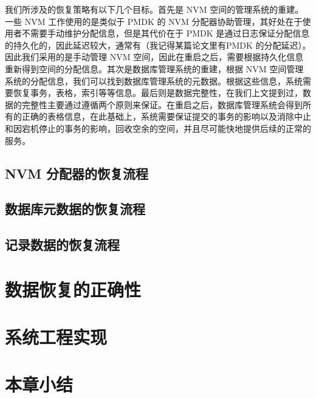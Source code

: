 我们所涉及的恢复策略有以下几个目标。首先是 NVM 空间的管理系统的重建。一些 NVM 工作使用的是类似于 PMDK 的 NVM 分配器协助管理，其好处在于使用者不需要手动维护分配信息，但是其代价在于 PMDK 是通过日志保证分配信息的持久化的，因此延迟较大，通常有（我记得某篇论文里有PMDK 的分配延迟）。因此我们采用的是手动管理 NVM 空间，因此在重启之后，需要根据持久化信息重新得到空间的分配信息。其次是数据库管理系统的重建，根据 NVM 空间管理系统的分配信息，我们可以找到数据库管理系统的元数据。根据这些信息，系统需要恢复事务，表格，索引等等信息。最后则是数据完整性，在我们上文提到过，数据的完整性主要通过遵循两个原则来保证。在重启之后，数据库管理系统会得到所有的正确的表格信息，在此基础上，系统需要保证提交的事务的影响以及消除中止和因宕机停止的事务的影响，回收空余的空间，并且尽可能快地提供后续的正常的服务。


\subsection{NVM 分配器的恢复流程}

\subsection{数据库元数据的恢复流程}

\subsection{记录数据的恢复流程}

\section{数据恢复的正确性}


\section{系统工程实现}

\section{本章小结}